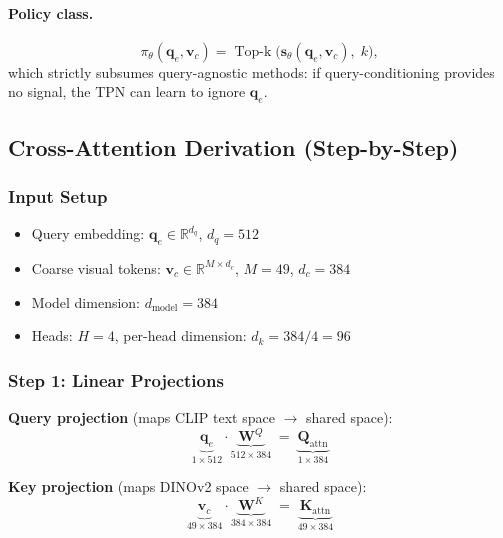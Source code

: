\documentclass[11pt,a4paper]{article}
\DeclareMathOperator{\TopK}{Top\text{-}k}
\newcommand{\R}{\mathbb{R}}
\newcommand{\vc}{\mathbf{v}_c}
\newcommand{\qe}{\mathbf{q}_e}
\newcommand{\vs}{\mathbf{s}}
\begin{document}
\paragraph{Policy class.}
\begin{equation}
  \pi_\theta(\qe,\vc) = \TopK\!\bigl(\vs_\theta(\qe,\vc),\; k\bigr),
  \label{eq:policy_class}
\end{equation}
which strictly subsumes query-agnostic methods: if query-conditioning
provides no signal, the TPN can learn to ignore $\qe$.

\subsection{Cross-Attention Derivation (Step-by-Step)}
\label{subsec:cross_attn_deriv}

\subsubsection{Input Setup}

\begin{itemize}[leftmargin=1.5em, itemsep=1pt]
  \item Query embedding: $\qe \in \R^{d_q}$, $d_q = 512$
  \item Coarse visual tokens: $\vc \in \R^{M \times d_c}$,
    $M = 49$, $d_c = 384$
  \item Model dimension: $d_{\text{model}} = 384$
  \item Heads: $H = 4$, per-head dimension: $d_k = 384/4 = 96$
\end{itemize}

\subsubsection{Step 1: Linear Projections}

\textbf{Query projection} (maps CLIP text space $\to$ shared space):
\begin{equation}
  \underbrace{\qe}_{1 \times 512}
  \cdot
  \underbrace{\mathbf{W}^Q}_{512 \times 384}
  \;=\;
  \underbrace{\mathbf{Q}_{\text{attn}}}_{1 \times 384}
  \label{eq:q_proj}
\end{equation}

\textbf{Key projection} (maps DINOv2 space $\to$ shared space):
\begin{equation}
  \underbrace{\vc}_{49 \times 384}
  \cdot
  \underbrace{\mathbf{W}^K}_{384 \times 384}
  \;=\;
  \underbrace{\mathbf{K}_{\text{attn}}}_{49 \times 384}
  \label{eq:k_proj}
\end{equation}
\end{document}
